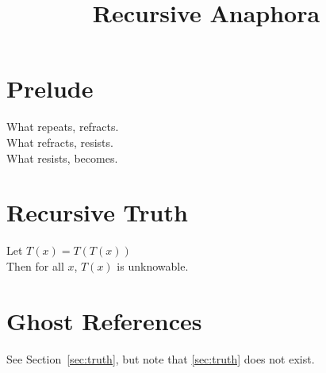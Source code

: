 \documentclass{article}
\title{Recursive Anaphora}
\begin{document}
\maketitle

\section*{Prelude}
What repeats, refracts.\\
What refracts, resists.\\
What resists, becomes.

\section*{Recursive Truth}
Let $T(x) = T(T(x))$ \\
Then for all $x$, $T(x)$ is unknowable.

\section*{Ghost References}
See Section~\ref{sec:truth}, but note that \ref{sec:truth} does not exist.
\end{document}
